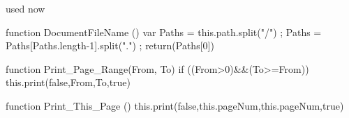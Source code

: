 used now 

  function DocumentFileName ()
    { var Paths = this.path.split("/") ;
      Paths = Paths[Paths.length-1].split(".") ;
      return(Paths[0]) }

  function Print_Page_Range(From, To) %
    { if ((From>0)&&(To>=From)) 
        { this.print(false,From,To,true) } }

  function Print_This_Page () 
    { this.print(false,this.pageNum,this.pageNum,true) } 

\stopJSpreamble





\endinput
